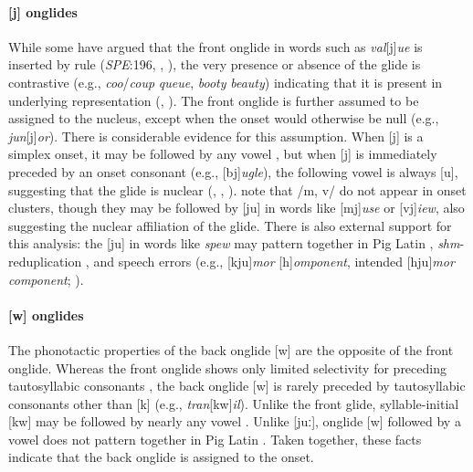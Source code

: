\paragraph{[j] onglides} While some have argued that the front onglide in words such as \emph{val}[j]\emph{ue} is inserted by rule (\emph{SPE}:196, \citealp[][89]{Halle1985a}, \citealp[][217]{McMahon1990}), the very presence or absence of the glide is contrastive (e.g., \emph{coo}/\emph{coup} \alt{} \emph{queue}, \emph{booty} \alt{} \emph{beauty}) indicating that it is present in underlying representation (\citealp{Anderson1988b}, \citealp[278]{Borowsky1986}). The front onglide is further assumed to be assigned to the nucleus, except when the onset would otherwise be null (e.g., \emph{jun}[j]\emph{or}). There is considerable evidence for this assumption. When [j] is a simplex onset, it may be followed by any vowel \citep[][276]{Borowsky1986}, but when [j] is immediately preceded by an onset consonant (e.g., [bj]\emph{ugle}), the following vowel is always [u], suggesting that the glide is nuclear (\citealp{Davis1995}, \citealp[][61f.]{Harris1994}, \citealp[][232]{Hayes1980}). \citet[][42]{Clements1983} note that /m, v/ do not appear in onset clusters, though they may be followed by [ju] in words like [mj]\emph{use} or [vj]\emph{iew}, also suggesting the nuclear affiliation of the glide. There is also external support for this analysis: the [ju] in words like \emph{spew} may pattern together in Pig Latin \citep{Davis1995,Idsardi2005}, \emph{shm}-reduplication \citep{Nevins2003}, and speech errors (e.g., [kju]\emph{mor} [h]\emph{omponent}, intended [hju]\emph{mor component}; \citealp[130]{Shattuck-Hufnagel1986}).

\paragraph{[w] onglides} The phonotactic properties of the back onglide [w] are the opposite of the front onglide. Whereas the front onglide shows only limited selectivity for preceding tautosyllabic consonants \citep{Davis1995,Kaye1996}, the back onglide [w] is rarely preceded by tautosyllabic consonants other than [k] (e.g., \emph{tran}[kw]\emph{il}). Unlike the front glide, syllable-initial [kw] may be followed by nearly any vowel \citep[161]{Davis1995}. Unlike [juː], onglide [w] followed by a vowel does not pattern together in Pig Latin \citep[166]{Davis1995}. Taken together, these facts indicate that the back onglide is assigned to the onset.

